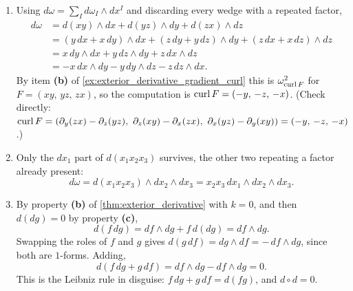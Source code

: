 \begin{exercisesolution}
\label{sol:ai_exterior_derivative_drill}
\begin{enumerate}[label=\textbf{(\alph*)}]
  \item Using $d\omega = \sum_I d\omega_I\wedge dx^I$ and discarding every wedge with a
    repeated factor,
    \begin{align*}
    d\omega &= d(xy)\wedge dx + d(yz)\wedge dy + d(zx)\wedge dz \\
      &= (y\,dx + x\,dy)\wedge dx + (z\,dy + y\,dz)\wedge dy + (z\,dx + x\,dz)\wedge dz \\
      &= x\,dy\wedge dx + y\,dz\wedge dy + z\,dx\wedge dz \\
      &= -x\,dx\wedge dy - y\,dy\wedge dz - z\,dz\wedge dx.
    \end{align*}
    By item \textbf{(b)} of \cref{ex:exterior_derivative_gradient_curl} this is
    $\omega^2_{\operatorname{curl} F}$ for $F = (xy,\,yz,\,zx)$, so the computation is
    $\operatorname{curl} F = (-y,\,-z,\,-x)$. (Check directly:
    $\curl F = (\partial_y(zx) - \partial_z(yz),\ \partial_z(xy) - \partial_x(zx),\
    \partial_x(yz) - \partial_y(xy)) = (-y,\,-z,\,-x)$.)
  \item Only the $dx_1$ part of $d(x_1x_2x_3)$ survives, the other two repeating a factor
    already present:
    \[d\omega = d(x_1x_2x_3)\wedge dx_2\wedge dx_3 = x_2x_3\,dx_1\wedge dx_2\wedge dx_3.\]
  \item By property \textbf{(b)} of \cref{thm:exterior_derivative} with $k = 0$, and then
    $d(dg) = 0$ by property \textbf{(c)},
    \[d(f\,dg) = df\wedge dg + f\,d(dg) = df\wedge dg.\]
    Swapping the roles of $f$ and $g$ gives $d(g\,df) = dg\wedge df = -\,df\wedge dg$, since both
    are $1$-forms. Adding,
    \[d(f\,dg + g\,df) = df\wedge dg - df\wedge dg = 0.\]
    This is the Leibniz rule in disguise: $f\,dg + g\,df = d(fg)$, and $d\circ d = 0$.
\end{enumerate}
\end{exercisesolution}

